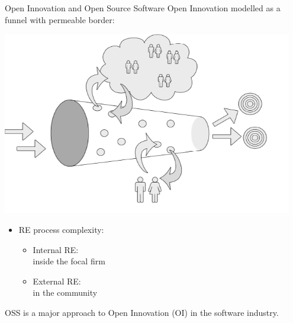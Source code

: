 \documentclass{slideclass}
\begin{document}
\begin{Slide}{Open Innovation and Open Source Software}
Open Innovation modelled as a funnel with permeable border:
{}

\vspace{1em}
\begin{minipage}{0.59\textwidth}
\includegraphics[width=0.95\textwidth]{img/oi}
\end{minipage}
\begin{minipage}{0.4\textwidth}
\SlideFontSmall\pause
\begin{itemize}
\item RE process complexity:
\begin{itemize}\SlideFontSmall
\item Internal RE:\\inside the focal firm
\item External RE:\\in the community
\end{itemize}
\end{itemize}
\end{minipage}

{\SlideFontSmall\pause\vspace{2em}OSS is a major approach to Open Innovation (OI) in the software industry.\vspace{1em}}
\end{Slide}
\end{document}
